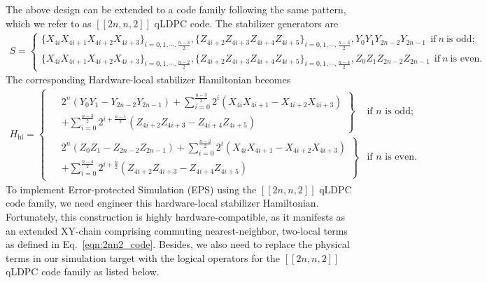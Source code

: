 \documentclass[%
10pt,tightenlines,
superscriptaddress,
 amsmath,amssymb,
 aps,
pra,
]{revtex4-2}
\begin{document}
The above design can be extended to a code family following the same pattern, which we refer to as $[[2n,n,2]]$ qLDPC code. The stabilizer generators are
\begin{align}
    S = \begin{cases}
        \{X_{4i}X_{4i+1}X_{4i+2}X_{4i+3}\}_{i = 0,1,\cdots,\frac{n-3}{2}},\{Z_{4i+2}Z_{4i+3}Z_{4i+4}Z_{4i+5}\}_{i = 0,1,\cdots,\frac{n-3}{2}},Y_0Y_1Y_{2n-2}Y_{2n-1} ~~ \text{if}~n~\text{is odd};\\
        \{X_{4i}X_{4i+1}X_{4i+2}X_{4i+3}\}_{i = 0,1,\cdots,\frac{n-2}{2}},\{Z_{4i+2}Z_{4i+3}Z_{4i+4}Z_{4i+5}\}_{i = 0,1,\cdots,\frac{n-4}{2}},Z_0Z_1Z_{2n-2}Z_{2n-1}~~\text{if}~n~\text{is even}.
    \end{cases}
\end{align}
The corresponding Hardware-local stabilizer Hamiltonian becomes
\begin{equation}\label{eqn:2nn2_code}
\begin{aligned}
H_{\text{hl}} = \begin{cases} 
    \left. \begin{aligned} 
        &2^n (Y_0 Y_1 - Y_{2n-2} Y_{2n-1}) + \sum_{i=0}^{\frac{n-3}{2}} 2^i (X_{4i} X_{4i+1} - X_{4i+2} X_{4i+3}) \\
        &+ \sum_{i=0}^{\frac{n-3}{2}} 2^{i + \frac{n-1}{2}} (Z_{4i+2} Z_{4i+3} - Z_{4i+4} Z_{4i+5})
    \end{aligned} \right\} & \text{if } n \text{ is odd;} \\[20pt]
    \left. \begin{aligned} 
        &2^n (Z_0 Z_1 - Z_{2n-2} Z_{2n-1}) + \sum_{i=0}^{\frac{n-2}{2}} 2^i (X_{4i} X_{4i+1} - X_{4i+2} X_{4i+3}) \\
        &+ \sum_{i=0}^{\frac{n-4}{2}} 2^{i + \frac{n}{2}} (Z_{4i+2} Z_{4i+3} - Z_{4i+4} Z_{4i+5})
    \end{aligned} \right\} & \text{if } n \text{ is even.}
\end{cases}
\end{aligned}
\end{equation}
To implement Error-protected Simulation (EPS) using the $[[2n, n, 2]]$ qLDPC code family, we need engineer this hardware-local stabilizer Hamiltonian. Fortunately, this construction is highly hardware-compatible, as it manifests as an extended XY-chain comprising commuting nearest-neighbor, two-local terms as defined in Eq.~\eqref{eqn:2nn2_code}. Besides, we also need to replace the physical terms in our simulation target with the logical operators for the $[[2n, n, 2]]$ qLDPC code family as listed below.
\end{document}
